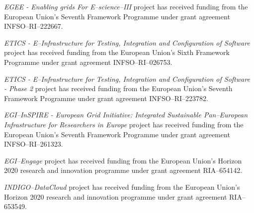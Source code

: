 {\sl EGEE - Enabling grids For E--science--III} project has received funding from the
European Union's Seventh Framework Programme under grant agreement INFSO--RI--222667.

{\sl ETICS - E--Infrastructure for Testing, Integration and Configuration of Software}
project has received funding from the European Union's Sixth Framework Programme under
grant agreement INFSO--RI--026753.

{\sl ETICS - E--Infrastructure for Testing, Integration and Configuration of Software - Phase 2}
project has received funding from the European Union's Seventh Framework Programme under grant
agreement INFSO--RI--223782.

{\sl EGI--InSPIRE - European Grid Initiative: Integrated Sustainable Pan--European
Infrastructure for Researchers in Europe} project has received funding from the European
Union's Seventh Framework Programme under grant agreement INFSO--RI--261323.

{\sl EGI--Engage} project has received funding from the European Union's Horizon 2020
research and innovation programme under grant agreement RIA--654142.

{\sl INDIGO--DataCloud} project has received funding from the European Union's Horizon
2020 research and innovation programme under grant agreement RIA--653549.

